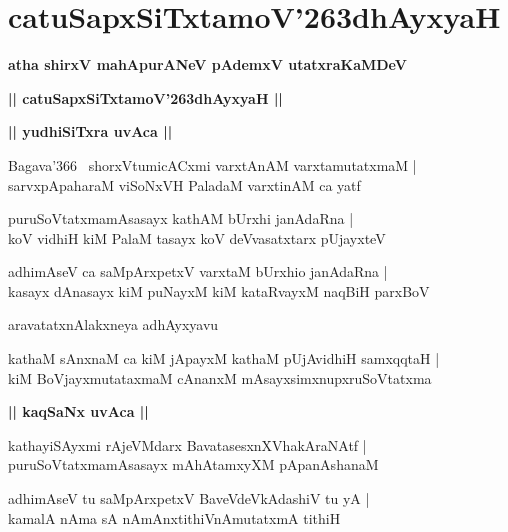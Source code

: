 \documentclass[twoside,12pt,openright]{book}
\def\S{\char'263}
\newcounter{shloka}[chapter]
\def\uvaca#1{\centerline{{\large\textbf{#1}}}}
\begin{document}
\chapter{catuSapxSiTxtamoV\S dhAyxyaH}

\begin{center}
{\LARGE\bfseries atha shirxV mahApurANeV pAdemxV utatxraKaMDeV}
\end{center}

\begin{center}
{\LARGE\bfseries || catuSapxSiTxtamoV\S dhAyxyaH ||}
\end{center}

\uvaca{ || yudhiSiTxra uvAca ||}

\begin{shloka}%
Bagava\char'366 ~shorxVtumicACxmi varxtAnAM varxtamutatxmaM |\\
sarvxpApaharaM viSoNxVH PaladaM varxtinAM ca yatf 
\end{shloka}

\begin{shloka}%
puruSoVtatxmamAsasayx kathAM bUrxhi janAdaRna |\\
koV vidhiH kiM PalaM tasayx koV deVvasatxtarx pUjayxteV 
\end{shloka}

\begin{shloka}%
adhimAseV ca saMpArxpetxV varxtaM bUrxhio janAdaRna |\\
kasayx dAnasayx kiM puNayxM kiM kataRvayxM naqBiH parxBoV
\end{shloka}

\begin{center}
aravatatxnAlakxneya adhAyxyavu
\end{center}

\begin{shloka}%
kathaM sAnxnaM ca kiM jApayxM kathaM pUjAvidhiH samxqqtaH |\\
kiM BoVjayxmutataxmaM cAnanxM mAsayxsimxnupxruSoVtatxma
\end{shloka}

\uvaca{|| kaqSaNx uvAca ||}

\begin{shloka}%
kathayiSAyxmi rAjeVMdarx BavatasesxnXVhakAraNAtf |\\
puruSoVtatxmamAsasayx mAhAtamxyXM pApanAshanaM 
\end{shloka}

\begin{shloka}%
adhimAseV tu saMpArxpetxV BaveVdeVkAdashiV tu yA |\\
kamalA nAma sA nAmAnxtithiVnAmutatxmA tithiH 
\end{shloka}
\end{document}
